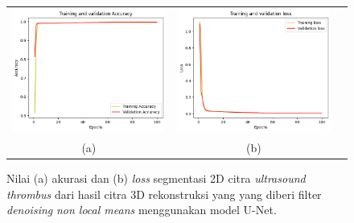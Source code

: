 \begin{enumerate}
	
	\begin{figure}[htbp]
		\centering
		\begin{tabular}{ccc}
			\includegraphics[scale=0.5]{bab4/Rekap Training/UNet/Nlm/1/acc_99,70923662185669.png} &
			\includegraphics[scale=0.5]{bab4/Rekap Training/UNet/Nlm/1/loss_0,0070.png} & \\
			(a) & (b)    %
		\end{tabular}
		\caption{Nilai (a) akurasi dan (b) \textit{loss} segmentasi 2D citra \textit{ultrasound} \textit{thrombus} dari hasil citra 3D rekonstruksi yang yang diberi filter \textit{denoising} \textit{non local means} menggunakan model U-Net.}
		\label{fig:performance-nlm-unet-rekonstruksi}
	\end{figure}
	
\end{enumerate}


